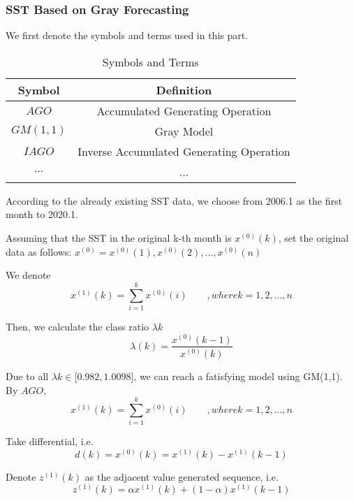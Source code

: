 \documentclass{mcmthesis}
\begin{document}
\subsubsection{SST Based on Gray Forecasting}\label{S4ss1}
	We first denote the symbols and terms used in this part.
\begin{table}[H]\large
    \centering
    \caption{Symbols and Terms}
    \label{symbol}
    \begin{tabular}{c c}
\toprule[2pt]
        Symbol & Definition\\
\hline
    $AGO$ & Accumulated Generating Operation\\
    $GM(1,1)$ & Gray Model\\
    $IAGO$ & Inverse Accumulated Generating Operation\\
    $...$ & ...\\
\bottomrule[2pt]
    \end{tabular}
\end{table}
	According to the already existing SST data, we choose from 2006.1 as the first month to 2020.1.\par
	Assuming that the SST in the original k-th month is $x^{(0)}(k)$, set the original data as follows: $ x^{(0)} = x^{(0)}(1), x^{(0)}(2), ..., x^{(0)}(n)$\par
	We denote
\begin{equation*}
	x^{(1)}(k) =  \sum_{i=1}^kx^{(0)}(i) \qquad  ,where k = 1, 2, ..., n
\end{equation*}\par
	Then, we calculate the class ratio $\lambda{k}$
\begin{equation*}
	\lambda(k) =  \frac{x^{(0)}(k-1)}{x^{(0)}(k)}
\end{equation*}\par
	Due to all $\lambda k \in \big[0.982, 1.0098\big]$, we can reach a fatisfying model using GM(1,1).
	By $AGO$, 
\begin{equation*}
	x^{(1)}(k) =  \sum_{i=1}^kx^{(0)}(i) \qquad  ,where k = 1, 2, ..., n
\end{equation*}\par
	Take differential, i.e.
\begin{equation*}
	d(k) = x^{(0)}(k) = x^{(1)}(k) - x^{(1)}(k-1)
\end{equation*}\par
	Denote $z^{(1)}(k)$ as the adjacent value generated sequence, i.e.
\begin{equation*}
	z^{(1)}(k) = \alpha x^{(1)}(k) + (1-\alpha)x^{(1)}(k-1)
\end{equation*}\par
\end{document}
